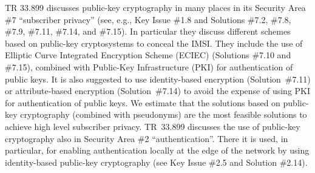 \documentclass[lnicst,sechang,a4paper]{svmultln}
\begin{document}
TR 33.899 discusses public-key cryptography in many places in its Security Area \#7 ``subscriber privacy'' (see, e.g., Key Issue \#1.8 and Solutions \#7.2, \#7.8, \#7.9, \#7.11, \#7.14, and \#7.15). In particular they discuss different schemes based on public-key cryptosystems to conceal the IMSI. They include the use of Elliptic Curve Integrated Encryption Scheme (ECIEC) (Solutions \#7.10 and \#7.15), combined with Public-Key Infrastructure (PKI) for authentication of public keys. It is also suggested to use identity-based encryption (Solution~\#7.11) or attribute-based encryption (Solution~\#7.14) to avoid the expense of using PKI for authentication of public keys. We estimate that the solutions based on public-key cryptography (combined with pseudonyms) are the most feasible solutions to achieve high level subscriber privacy. TR~33.899 discusses the use of public-key cryptography also in Security Area \#2 ``authentication''. There it is used, in particular, for enabling authentication locally at the edge of the network by using identity-based public-key cryptography (see Key Issue \#2.5 and Solution \#2.14).





\end{document}
